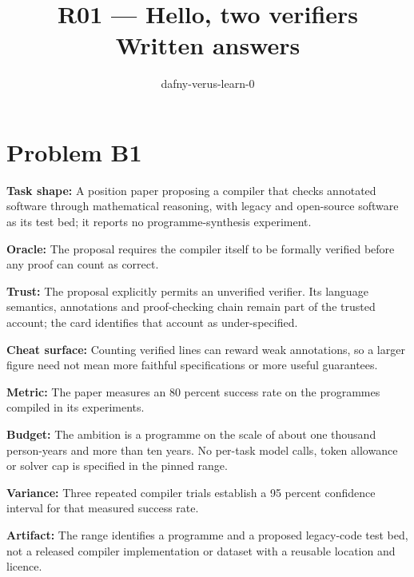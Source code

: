 \documentclass[11pt]{article}
\title{R01 --- Hello, two verifiers \\ \large Written answers}
\author{dafny-verus-learn-0}
\date{}
\begin{document}
\maketitle
\section*{Problem B1}\label{ans:B1}
\begin{answer}
\textbf{Task shape:} A position paper proposing a compiler that checks annotated software through mathematical reasoning, with legacy and open-source software as its test bed; it reports no programme-synthesis experiment.

\textbf{Oracle:} The proposal requires the compiler itself to be formally verified before any proof can count as correct.

\textbf{Trust:} The proposal explicitly permits an unverified verifier. Its language semantics, annotations and proof-checking chain remain part of the trusted account; the card identifies that account as under-specified.

\textbf{Cheat surface:} Counting verified lines can reward weak annotations, so a larger figure need not mean more faithful specifications or more useful guarantees.

\textbf{Metric:} The paper measures an 80 percent success rate on the programmes compiled in its experiments.

\textbf{Budget:} The ambition is a programme on the scale of about one thousand person-years and more than ten years. No per-task model calls, token allowance or solver cap is specified in the pinned range.

\textbf{Variance:} Three repeated compiler trials establish a 95 percent confidence interval for that measured success rate.

\textbf{Artifact:} The range identifies a programme and a proposed legacy-code test bed, not a released compiler implementation or dataset with a reusable location and licence.
\end{answer}
\end{document}
